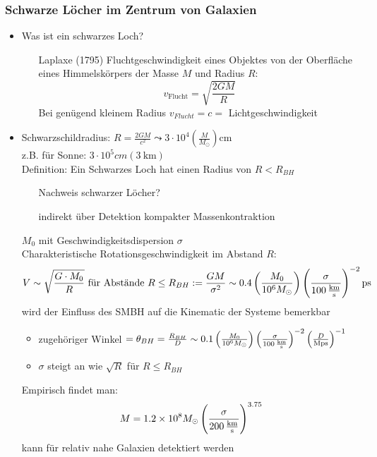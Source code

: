 \subsubsection{Schwarze Löcher im Zentrum von Galaxien}
\begin{itemize}
	\item Was ist ein schwarzes Loch?
		\begin{itemize}
			\item[Laplaxe (1795)] Fluchtgeschwindigkeit eines Objektes von der Oberfläche eines Himmelskörpers der Masse $M$ und Radius $R$:
				\begin{equation*}
					v_\text{Flucht}=\sqrt{\frac{2GM}{R}}
				\end{equation*}
				Bei genügend kleinem Radius $v_{Flucht}=c=$ Lichtgeschwindigkeit
		\end{itemize}
	\item Schwarzschildradius: $R=\frac{2GM}{c^2}\leadsto 3\cdot 10^4\left(\frac{M}{M_\odot}\right)\si{\cm}$\\
		z.B. für Sonne: $3\cdot 10^5\si{cm} (\SI{3}{\km})$\\
		Definition: Ein Schwarzes Loch hat einen Radius von $R<R_{BH}$
		\begin{itemize}
			\item[] Nachweis schwarzer Löcher?
			\item[] indirekt über Detektion kompakter Massenkontraktion
		\end{itemize}
		$M_0$ mit Geschwindigkeitsdispersion $\sigma$\\
		Charakteristische Rotationsgeschwindigkeit im Abstand $R$:
		\begin{equation*}
			V\sim\sqrt{\frac{G\cdot M_0}{R}} \text{ für Abstände } R\leq R_{BH}:=\frac{GM}{\sigma^2}\sim\num{0.4}\left(\frac{M_0}{10^6M_\odot}\right)\left(\frac{\sigma}{\SI{100}{\frac{\km}{\s}}}\right)^{-2}\si{\ps}
		\end{equation*}
		wird der Einfluss des SMBH auf die Kinematic der Systeme bemerkbar
		\begin{itemize}
			\item zugehöriger Winkel $=\theta_{BH}=\frac{R_{BH}}{D}\sim 0.1\left(\frac{M_0}{10^6M_\odot}\right)\left(\frac{\sigma}{\SI{100}{\frac{\km}{\s}}}\right)^{-2}\left(\frac{D}{\si{M\ps}}\right)^{-1}$
			\item $\sigma$ steigt an wie $\sqrt{R}$ für $R\leq R_{BH}$
		\end{itemize}
		Empirisch findet man:
		\begin{equation*}
			M=\num{1.2e8}M_\odot\left(\frac{\sigma}{\SI{200}{\frac{\km}{\s}}}\right)^{\num{3.75}}
		\end{equation*}
		kann für relativ nahe Galaxien detektiert werden
\end{itemize}

